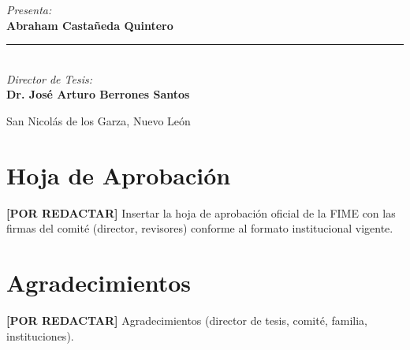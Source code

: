 \documentclass[12pt]{report}
\newcommand{\pendiente}[1]{\par\noindent\colorbox{lightbg}{%
  \begin{minipage}{0.94\linewidth}\small
  \textcolor{uanlgold}{\textbf{[POR REDACTAR]}} #1
  \end{minipage}}\par\medskip}
\begin{document}
\begin{titlepage}
\begin{center}
\colorbox{lightbg}{%
  \begin{minipage}{0.68\textwidth}
    \vspace{0.5cm}
    \centering
    {\small\textit{\textcolor{uanlblue}{Presenta:}}}\\[0.3cm]
    {\fontsize{14}{17}\selectfont\bfseries Abraham Casta\~neda Quintero}\\[0.5cm]
    {\color{uanlgold}\rule{0.7\linewidth}{0.8pt}}\\[0.4cm]
    {\small\textit{\textcolor{uanlblue}{Director de Tesis:}}}\\[0.3cm]
    {\fontsize{12}{15}\selectfont\bfseries Dr. Jos\'e Arturo Berrones Santos}\\[0.5cm]
    \vspace{0.5cm}
  \end{minipage}%
}

\end{center}

\vfill

\begin{center}
  {\small\textcolor{uanlblue}{San Nicol\'as de los Garza, Nuevo Le\'on%
  \enspace\textbullet{}}}
\end{center}

\vspace{1.4cm}
\end{titlepage}


\chapter*{Hoja de Aprobaci\'on}
\pendiente{Insertar la hoja de aprobaci\'on oficial de la FIME con las firmas
del comit\'e (director, revisores) conforme al formato institucional vigente.}

\chapter*{Agradecimientos}
\pendiente{Agradecimientos (director de tesis, comit\'e, familia, instituciones).}

\end{document}
